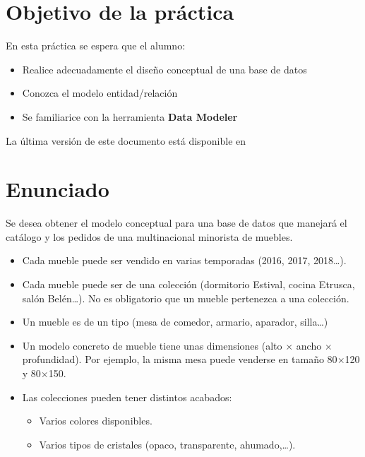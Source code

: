 

\renewcommand{\hmwkTitle}{Diseño de base de datos con \textbf{Data Modeler}}

\renewcommand{\hmwkClass}{Gestión de Base de Datos}




\primerapagina


\section{Objetivo de la práctica} En esta práctica se espera que el alumno:
\begin{itemize}
\item Realice adecuadamente el diseño conceptual de una base de datos
\item Conozca el modelo entidad/relación
\item Se familiarice con la herramienta \textbf{Data Modeler}
  
\end{itemize}

La última versión de este documento está disponible en 


\section{Enunciado}

Se desea obtener el modelo conceptual para una base de datos que manejará el catálogo y los pedidos de una multinacional minorista de muebles.
\begin{itemize}
\item Cada mueble puede ser vendido en varias temporadas (2016, 2017, 2018…).
\item Cada mueble puede ser de una colección (dormitorio Estival, cocina Etrusca, salón Belén…). No es obligatorio que un mueble pertenezca a una colección.
  
\item Un mueble es de un tipo (mesa de comedor, armario, aparador, silla\ldots)
\item Un modelo concreto de mueble tiene unas dimensiones (alto $\times$ ancho $\times$ profundidad). Por ejemplo, la misma mesa puede venderse en tamaño 80$\times$120 y 80$\times$150.
\item Las colecciones pueden tener distintos acabados:
  \begin{itemize}
  \item Varios colores disponibles.
  \item Varios tipos de cristales (opaco, transparente, ahumado,…).
  \end{itemize}
\end{itemize}


